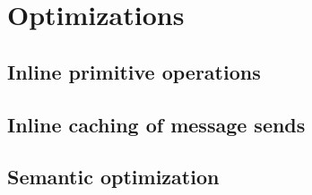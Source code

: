 \chapter{Optimizations}
\label{chap:Optimizations}

\section{Inline primitive operations}

\section{Inline caching of message sends}

\section{Semantic optimization}
